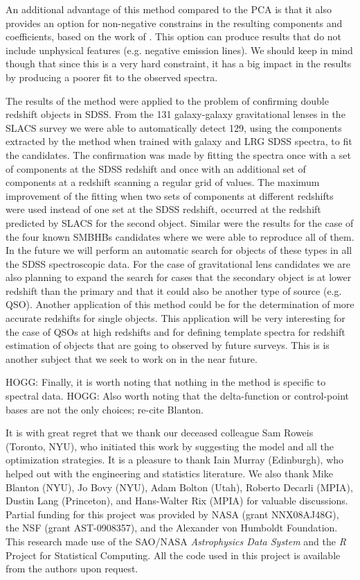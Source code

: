 \documentclass[12pt,preprint]{aastex}
\newcommand{\project}[1]{\textsl{#1}}
\begin{document}
An additional advantage of this method compared to the PCA is that it
also provides an option for non-negative constrains in the resulting
components and coefficients, based on the work of \cite{blanton}. This
option can produce results that do not include unphysical features
(e.g. negative emission lines). We should keep in mind though that
since this is a very hard constraint, it has a big impact in the
results by producing a poorer fit to the observed spectra.

The results of the method were applied to the problem of confirming
double redshift objects in SDSS. From the 131 galaxy-galaxy
gravitational lenses in the SLACS survey we were able to automatically
detect 129, using the components extracted by the method when trained
with galaxy and LRG SDSS spectra, to fit the candidates. The
confirmation was made by fitting the spectra once with a set of
components at the SDSS redshift and once with an additional set of
components at a redshift scanning a regular grid of values. The
maximum improvement of the fitting when two sets of components at
different redshifts were used instead of one set at the SDSS redshift,
occurred at the redshift predicted by SLACS for the second
object. Similar were the results for the case of the four known SMBHBs
candidates where we were able to reproduce all of them. In the future
we will perform an automatic search for objects of these types in all
the SDSS spectroscopic data. For the case of gravitational lens
candidates we are also planning to expand the search for cases that
the secondary object is at lower redshift than the primary and that it
could also be another type of source (e.g. QSO). Another application
of this method could be for the determination of more accurate
redshifts for single objects. This application will be very
interesting for the case of QSOs at high redshifts and for defining
template spectra for redshift estimation of objects that are going to
observed by future surveys. This is is another subject that we seek to
work on in the near future.

HOGG: Finally, it is worth noting that nothing in the method is
specific to spectral data.  HOGG: Also worth noting that the
delta-function or control-point bases are not the only choices;
re-cite Blanton.

\acknowledgments It is with great regret that we thank our deceased
colleague Sam Roweis (Toronto, NYU), who initiated this work by
suggesting the model and all the optimization strategies.  It is a
pleasure to thank Iain Murray (Edinburgh), who helped out with the
engineering and statistics literature.  We also thank Mike Blanton
(NYU), Jo Bovy (NYU), Adam Bolton (Utah), Roberto Decarli (MPIA),
Dustin Lang (Princeton), and Hans-Walter Rix (MPIA) for valuable
discussions.  Partial funding for this project was provided by NASA
(grant NNX08AJ48G), the NSF (grant AST-0908357), and the Alexander von
Humboldt Foundation.  This research made use of the SAO/NASA
\project{Astrophysics Data System} and the \project{R} Project for
Statistical Computing.  All the code used in this project is available
from the authors upon request.
\end{document}
